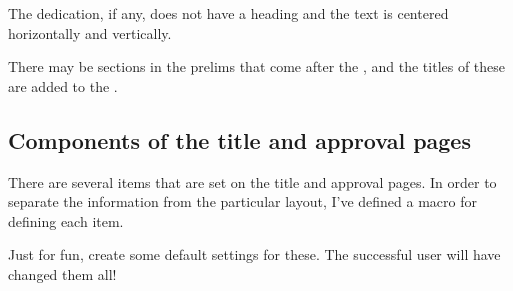     The dedication, if any, does not have a heading and the text is centered
horizontally and vertically. 
\begin{lcode}
\newcommand{\asudedication}[1]{%
  {\clearpage\mbox{}\vfill\centering #1 \par\vfill\clearpage}}

\end{lcode}

    There may be sections in the prelims that come after the \toc, and
the titles of these are added to the \toc.
\begin{lcode}
\newcommand{\prelimtitle}[1]{%
  \pretoctitle{#1}\addcontentsline{toc}{chapter}{#1}}
\end{lcode}

\subsection{Components of the title and approval pages}

    There are several items that are set on the title and approval pages.
In order to separate the information from the particular layout, I've 
defined a macro for defining each item.
\begin{lcode}
\newcommand{\settitle}[1]{\def\asutitle{#1}}
\newcommand{\setauthor}[1]{\def\asuauthor{#1}}
\newcommand{\setdoctype}[1]{\def\asudoctype{#1}}
\newcommand{\masters}{\def\asudegree{Master of Arts}}
\newcommand{\doctors}{\def\asudegree{Doctor of Philosophy}}
\newcommand{\setdefdate}[1]{\def\asudefdate{#1}}
\newcommand{\setgraddate}[1]{\def\asugraddate{#1}}
\newcommand{\setchair}[1]{\def\asuchair{#1, Chair}}
\newcommand{\setchairs}[2]{%
  \def\asuchair{#1, Co-chair \\ #2, Co-chair}}
\newcommand{\setmembers}[1]{\def\asumembers{#1\par}}

\end{lcode}

    Just for fun, create some default settings for these. The successful 
user will have changed them all!
\begin{lcode}
\masters  %
\end{lcode}

